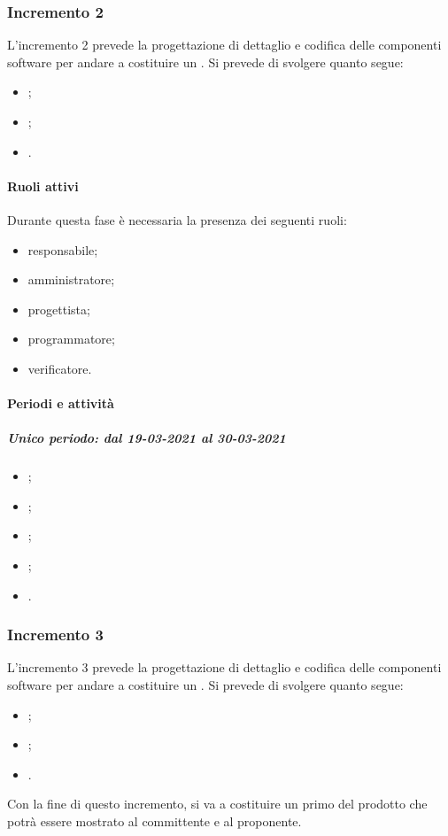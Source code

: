
\subsubsection{Incremento 2}
L'incremento 2 prevede la progettazione di dettaglio e codifica delle componenti software per andare a costituire un . Si prevede di svolgere quanto segue:
\begin{itemize}
	\item ;
	\item ;
	\item .
\end{itemize}

\paragraph{Ruoli attivi}
Durante questa fase è necessaria la presenza dei seguenti ruoli: 
\begin{itemize} 
	\item responsabile; 
	\item amministratore; 
	\item progettista; 
	\item programmatore; 
	\item verificatore.
\end{itemize}

\paragraph{Periodi e attività}
\subparagraph{Unico periodo: dal 19-03-2021 al 30-03-2021}
\begin{itemize}
	\item ;
	\item ;
	\item ;
	\item ;
	\item .
\end{itemize}


\subsubsection{Incremento 3}
L'incremento 3 prevede la progettazione di dettaglio e codifica delle componenti software per andare a costituire un . Si prevede di svolgere quanto segue:
\begin{itemize}
	\item ;
	\item ;
	\item .
\end{itemize}
Con la fine di questo incremento, si va a costituire un primo  del prodotto che potrà essere mostrato al committente e al proponente.

